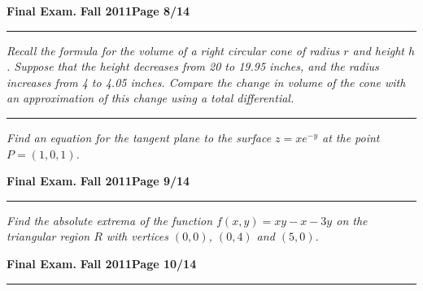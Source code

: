 \documentclass[12pt]{article}
\begin{document}
\hfill{\large\bf Final Exam.}\hfill{\large\bf
  Fall 2011}\hfill{\large\bf Page 8/14}\hrule

\bigskip
{\problem[15 pts] \em Recall the formula for the volume of a right circular cone of radius $r$ and height $h$.  Suppose that the height decreases from 20 to 19.95 inches, and the radius increases from 4 to 4.05 inches.  Compare the change in volume of the cone with an approximation of this change using a total differential.}
\vspace{9cm}
\begin{flushright}
\end{flushright}
\hrule
{\problem[10 pts] \em Find an equation for the tangent plane to the surface $z=xe^{-y}$ at the point $P=(1,0,1)$.}
\vspace{4cm}
\begin{flushright}
\end{flushright}
\newpage

\hfill{\large\bf Final Exam.}\hfill{\large\bf
  Fall 2011}\hfill{\large\bf Page 9/14}\hrule

\bigskip
{\problem[20 pts] \em Find the absolute extrema of the function $f(x,y) = xy-x-3y$ on the triangular region $R$ with vertices $(0,0)$, $(0,4)$ and $(5,0)$.}
\vspace{18.5cm}
\begin{flushright}
\end{flushright}
\newpage


\hfill{\large\bf Final Exam.}\hfill{\large\bf
  Fall 2011}\hfill{\large\bf Page 10/14}\hrule
\end{document}

